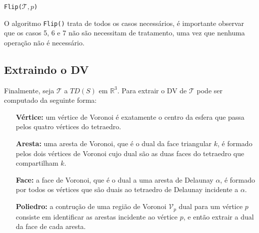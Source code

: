 \begin{algorithm}[H]
\DontPrintSemicolon %
\caption{\texttt{Flip($\mathcal{T}, p$)}}
\label{alg1}
\end{algorithm}

O algoritmo \texttt{Flip()} trata de todos os casos necessários, é 
importante observar que os casos 5, 6 e 7 não são necessitam de tratamento, uma 
vez que nenhuma operação não é necessário. 

\subsection{Extraindo o DV}

Finalmente, seja $\mathcal{T}$ a $TD(S)$ em $\mathbb{R}^3$. Para extrair o DV
de $\mathcal{T}$ pode ser computado da seguinte forma:
\begin{itemize}
    \item[\textbf{Vértice: }] um vértice de Voronoi é exatamente o centro da esfera
    que passa pelos quatro vértices do tetraedro.
    \item[\textbf{Aresta: }] uma aresta de Voronoi, que é o dual da face triangular $k$,
    é formado pelos dois vértices de Voronoi cujo dual são as duas faces do tetraedro 
    que compartilham $k$.
    \item[\textbf{Face: }] a face de Voronoi, que é o dual a uma aresta de Delaunay $\alpha$,
    é formado por todos os vértices que são duais ao tetraedro de Delaunay incidente 
    a $\alpha$. 
    \item[\textbf{Poliedro: }] a contrução de uma região de Voronoi $\mathcal{V}_p$ dual 
    para um vértice $p$ consiste em identificar as arestas incidente ao vértice $p$, e 
    então extrair a dual da face de cada aresta.
\end{itemize}


